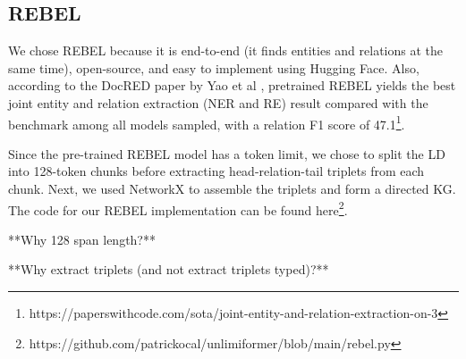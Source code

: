 \subsection*{REBEL}
We chose REBEL because it is end-to-end (it finds entities and relations at the same time), open-source, and easy to implement using Hugging Face. Also, according to the DocRED paper by Yao et al \cite{yao2019DocRED}, pretrained REBEL yields the best joint entity and relation extraction (NER and RE) result compared with the benchmark among all models sampled, with a relation F1 score of 47.1\footnote{https://paperswithcode.com/sota/joint-entity-and-relation-extraction-on-3}.

Since the pre-trained REBEL model has a token limit, we chose to split the LD into 128-token chunks before extracting head-relation-tail triplets from each chunk. Next, we used NetworkX to assemble the triplets and form a directed KG. The code for our REBEL implementation can be found here\footnote{https://github.com/patrickocal/unlimiformer/blob/main/rebel.py}.

**Why 128 span length?**

**Why extract triplets (and not extract triplets typed)?**